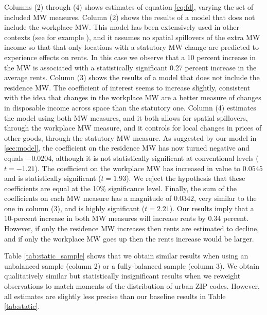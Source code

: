Columns (2) through (4) shows estimates of equation \eqref{eq:fd}, varying the
set of included MW measures.
Column (2) shows the results of a model that does not include the workplace MW. 
This model has been extensively used in other contexts (see for example \textcite{MeerWest2016}), and it assumes no spatial spillovers of the extra MW 
income so that that only locations with a statutory MW change are predicted to 
experience effects on rents. 
In this case we observe that a 10 percent increase in the MW is associated with
a statistically significant 0.27 percent increase in the average rents.
Column (3) shows the results of a model that does not include the residence MW.
The coefficient of interest seems to increase slightly, consistent with the idea 
that changes in the workplace MW are a better measure of changes in disposable 
income across space than the statutory one.
Column (4) estimates the model using both MW measures, and it both allows for 
spatial spillovers, through the workplace MW measure, and it controls for local 
changes in prices of other goods, through the statutory MW measure.
As suggested by our model in \ref{sec:model}, the coefficient on the residence 
MW has now turned negative and equals $-0.0204$, although it is not 
statistically significant at conventional levels ($t=-1.21$).
The coefficient on the workplace MW has increased in value to $0.0545$ and is 
statistically significant ($t=1.93$).
We reject the hypothesis that these coefficients are equal at the 10\% 
significance level.
Finally, the sum of the coefficients on each MW measure has a magnitude of 
$0.0342$, very similar to the one in column (3), and is highly significant 
($t=2.21$).
Our results imply that a 10-percent increase in both MW measures will increase
rents by $0.34$ percent.
However, if only the residence MW increases then rents are estimated to decline,
and if only the workplace MW goes up then the rents increase would be larger.

Table \ref{tab:static_sample} shows that we obtain similar results when
using an unbalanced sample (column 2) or a fully-balanced sample (column 3).
We obtain qualitatively similar but statistically insignificant results when
we reweight observations to match moments of the distribution of urban ZIP 
codes.
However, all estimates are slightly less precise than our baseline results in 
Table \ref{tab:static}.


